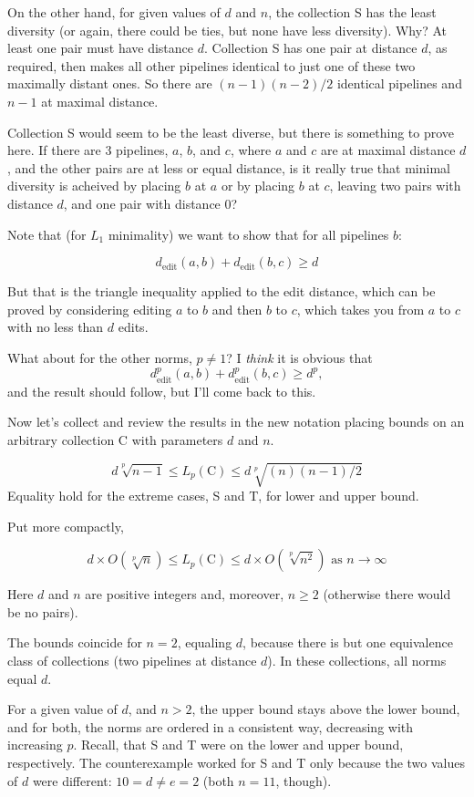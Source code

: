 \documentclass{article}
\begin{document}
On the other hand, for given values of $d$ and $n$, the collection S
has the least diversity (or again, there could be ties, but none have
less diversity).  Why?  At least one pair must have distance $d$.
Collection S has one pair at distance $d$, as required, then makes all
other pipelines identical to just one of these two maximally distant
ones.  So there are $(n-1)(n-2)/2$ identical pipelines and $n-1$ at
maximal distance.

Collection S would seem to be the least diverse, but there is
something to prove here.  If there are 3 pipelines, $a$, $b$, and $c$,
where $a$ and $c$ are at maximal distance $d$, and the other pairs are
at less or equal distance, is it really true that minimal diversity is
acheived by placing $b$ at $a$ or by placing $b$ at $c$, leaving two
pairs with distance $d$, and one pair with distance 0?

Note that (for $L_1$ minimality) we want to show that for all
pipelines $b$:

$$d_{\mbox{edit}}(a, b) + d_{\mbox{edit}}(b, c) \geq d$$

But that is the triangle inequality applied to the edit distance,
which can be proved by considering editing $a$ to $b$ and then $b$ to
$c$, which takes you from $a$ to $c$ with no less than $d$ edits.

What about for the other norms, $p \neq 1$?  I \emph{think} it is
obvious that
$$d^p_{\mbox{edit}}(a, b) + d^p_{\mbox{edit}}(b, c) \geq d^p,$$ and
the result should follow, but I'll come back to this.

Now let's collect and review the results in the new notation placing
bounds on an arbitrary collection C with parameters $d$ and $n$.

$$ d \sqrt[p]{n-1} \leq L_p(\mbox{C}) \leq d \sqrt[p]{(n)(n-1)/2} $$
Equality hold for the extreme cases, S and T, for lower and upper bound.

Put more compactly,

$$d \times O\left(\sqrt[p]{n}\right) \leq L_p(\mbox{C}) \leq d \times
O\left(\sqrt[p]{n^2}\right) \mbox{ as } n \rightarrow \infty$$

Here $d$ and $n$ are positive integers and, moreover, $n \geq 2$
(otherwise there would be no pairs).

The bounds coincide for $n=2$, equaling $d$, because there is but one
equivalence class of collections (two pipelines at distance $d$).  In
these collections, all norms equal $d$.

For a given value of $d$, and $n > 2$, the upper bound stays above the
lower bound, and for both, the norms are ordered in a consistent way,
decreasing with increasing $p$.  Recall, that S and T were on the
lower and upper bound, respectively.  The counterexample worked for S
and T only because the two values of $d$ were different: $10 = d \neq
e = 2$ (both $n = 11$, though).
\end{document}
